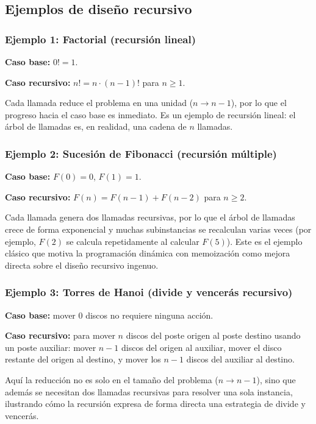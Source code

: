 \documentclass{article}
\begin{document}
\subsection{Ejemplos de diseño recursivo}
 
\subsubsection{Ejemplo 1: Factorial (recursión lineal)}
 
\textbf{Caso base:} $0! = 1$.

\textbf{Caso recursivo:} $n! = n \cdot (n-1)!$ para $n \geq 1$.
 
Cada llamada reduce el problema en una unidad ($n \to n-1$), por lo que el
progreso hacia el caso base es inmediato. Es un ejemplo de recursión lineal:
el árbol de llamadas es, en realidad, una cadena de $n$ llamadas.
 
\subsubsection{Ejemplo 2: Sucesión de Fibonacci (recursión múltiple)}
 
\textbf{Caso base:} $F(0) = 0$, $F(1) = 1$.

\textbf{Caso recursivo:} $F(n) = F(n-1) + F(n-2)$ para $n \geq 2$.
 
Cada llamada genera dos llamadas recursivas, por lo que el árbol de llamadas
crece de forma exponencial y muchas subinstancias se recalculan varias
veces (por ejemplo, $F(2)$ se calcula repetidamente al calcular $F(5)$). Este
es el ejemplo clásico que motiva la programación dinámica con memoización
como mejora directa sobre el diseño recursivo ingenuo.
 
\subsubsection{Ejemplo 3: Torres de Hanoi (divide y vencerás recursivo)}
 
\textbf{Caso base:} mover $0$ discos no requiere ninguna acción.

\textbf{Caso recursivo:} para mover $n$ discos del poste origen al poste
destino usando un poste auxiliar: mover $n-1$ discos del origen al auxiliar,
mover el disco restante del origen al destino, y mover los $n-1$ discos del
auxiliar al destino.
 
Aquí la reducción no es solo en el tamaño del problema ($n \to n-1$), sino
que además se necesitan dos llamadas recursivas para resolver una sola
instancia, ilustrando cómo la recursión expresa de forma directa una
estrategia de divide y vencerás.
\end{document}
